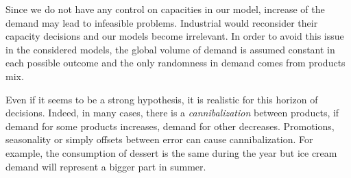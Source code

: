 Since we do not have any control on capacities in our model, increase of the demand may lead to infeasible problems.
Industrial would reconsider their capacity decisions and our models become irrelevant.
In order to avoid this issue in the considered models, the global volume of demand is assumed constant in each possible outcome and the only randomness in demand comes from products mix.


Even if it seems to be a strong hypothesis, it is realistic for this horizon of decisions.
Indeed, in many cases, there is a \emph{cannibalization} between products, \ie if demand for some products increases, demand for other decreases.
Promotions, seasonality or simply offsets between error can cause cannibalization.
For example, the consumption of dessert is the same during the year but ice cream demand will represent a bigger part in summer.



